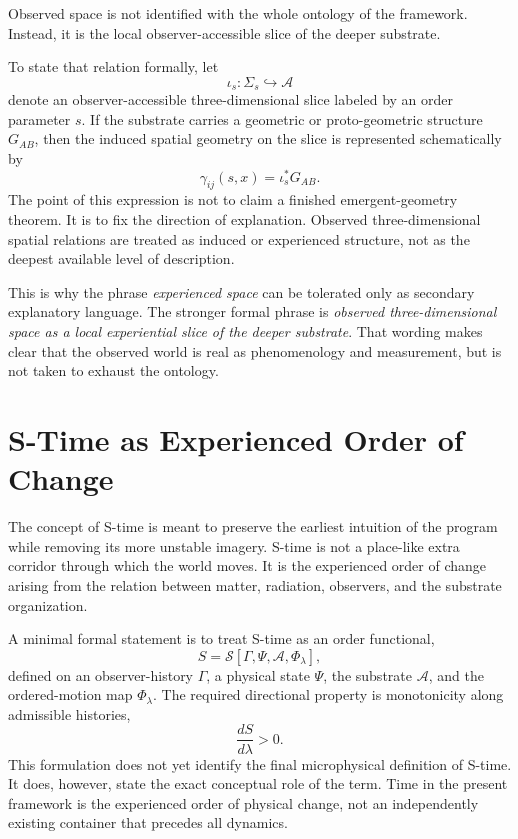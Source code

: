 \documentclass[11pt]{article}
\newcommand{\Order}{\mathcal{S}}
\newcommand{\Sub}{\mathcal{A}}
\begin{document}
Observed space is not identified with the whole ontology of the framework. Instead, it is the local observer-accessible slice of the deeper substrate.

To state that relation formally, let
\[
\iota_s:\Sigma_s \hookrightarrow \Sub
\]
denote an observer-accessible three-dimensional slice labeled by an order parameter \(s\). If the substrate carries a geometric or proto-geometric structure \(G_{AB}\), then the induced spatial geometry on the slice is represented schematically by
\[
\gamma_{ij}(s,x) = \iota_s^{*} G_{AB}.
\]
The point of this expression is not to claim a finished emergent-geometry theorem. It is to fix the direction of explanation. Observed three-dimensional spatial relations are treated as induced or experienced structure, not as the deepest available level of description.

This is why the phrase \emph{experienced space} can be tolerated only as secondary explanatory language. The stronger formal phrase is \emph{observed three-dimensional space as a local experiential slice of the deeper substrate}. That wording makes clear that the observed world is real as phenomenology and measurement, but is not taken to exhaust the ontology.

\section{S-Time as Experienced Order of Change}

The concept of S-time is meant to preserve the earliest intuition of the program while removing its more unstable imagery. S-time is not a place-like extra corridor through which the world moves. It is the experienced order of change arising from the relation between matter, radiation, observers, and the substrate organization.

A minimal formal statement is to treat S-time as an order functional,
\[
S = \Order[\Gamma,\Psi,\Sub,\Phi_{\lambda}],
\]
defined on an observer-history \(\Gamma\), a physical state \(\Psi\), the substrate \(\Sub\), and the ordered-motion map \(\Phi_{\lambda}\). The required directional property is monotonicity along admissible histories,
\[
\frac{dS}{d\lambda} > 0.
\]
This formulation does not yet identify the final microphysical definition of S-time. It does, however, state the exact conceptual role of the term. Time in the present framework is the experienced order of physical change, not an independently existing container that precedes all dynamics.
\end{document}
